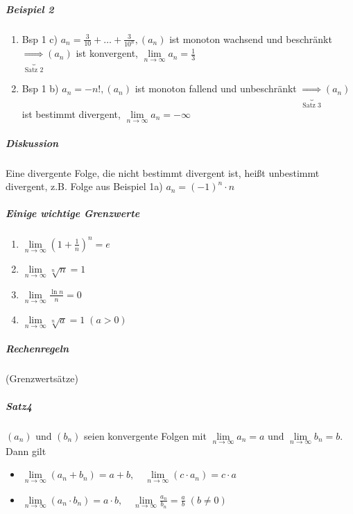 \documentclass[a4paper]{scrartcl}
\begin{document}
\subparagraph{Beispiel 2} \begin{enumerate}
\item Bsp 1 c) $a_n = \frac{3}{10} + \dots + \frac{3}{10^n}, (a_n)$ ist monoton wachsend und beschränkt $\underbrace{\Rightarrow}_{\text{Satz 2}} (a_n)$ ist konvergent, $\lim\limits_{n \to \infty} a_n = \frac{1}{3}$
\item Bsp 1 b) $a_n = -n!, (a_n)$ ist monoton fallend und unbeschränkt $\underbrace{\Rightarrow}_{\text{Satz 3}} (a_n)$ ist bestimmt divergent, $\lim\limits_{n \to \infty} a_n = - \infty$
\end{enumerate}

\subparagraph{Diskussion} Eine divergente Folge, die nicht bestimmt divergent ist, heißt unbestimmt divergent, z.B. Folge aus Beispiel 1a) $a_n = (-1)^n \cdot n$

\subparagraph{Einige wichtige Grenzwerte}
\begin{enumerate}
\item $\lim\limits_{n \to \infty} ( 1 + \frac{1}{n})^n = e$
\item $\lim\limits_{n \to \infty} \sqrt[n]{n} = 1$
\item $\lim\limits_{n \to \infty} \frac{\ln{n}}{n} = 0$
\item $\lim\limits_{n \to \infty} \sqrt[n]{a} = 1 \; (a > 0)$
\end{enumerate}

\subparagraph{Rechenregeln}(Grenzwertsätze)

\subparagraph{Satz4} $(a_n) \text{ und } (b_n)$ seien konvergente Folgen mit
$\lim\limits_{n \to \infty} a_n = a \text{ und } \lim\limits_{n \to \infty} b_n = b$.\\
Dann gilt
\begin{itemize}
\item $\lim\limits_{n \to \infty} ( a_n + b_n) = a+b,\quad \lim\limits_{n \to \infty} ( c \cdot a_n) = c \cdot a$
\item $\lim\limits_{n \to \infty} (a_n \cdot b_n) = a \cdot b, \quad \lim\limits_{n \to \infty} \frac{a_n}{b_n} = \frac{a}{b} \; (b \neq 0 )$
\end{itemize}
\end{document}
